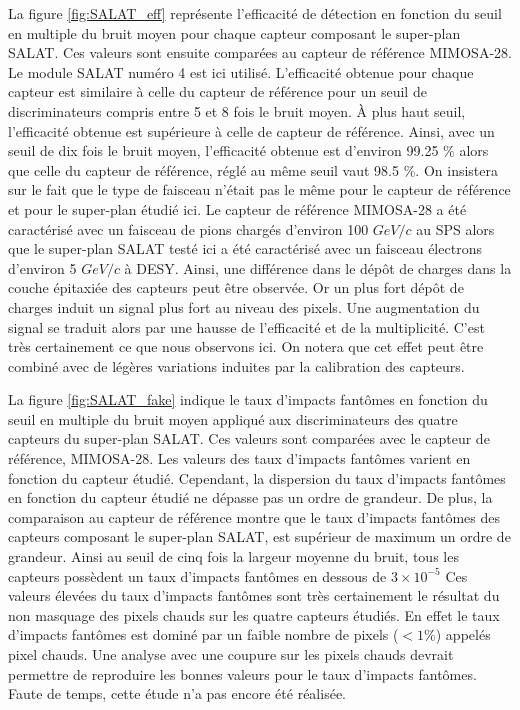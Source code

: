   \medskip
   
  La figure \ref{fig:SALAT_eff} repr\'esente l'efficacit\'e de d\'etection en fonction du seuil en multiple du bruit moyen pour chaque capteur composant le super-plan SALAT. Ces valeurs sont ensuite compar\'ees au capteur de r\'ef\'erence MIMOSA-28. Le module SALAT num\'ero 4 est ici utilis\'e. L'efficacit\'e obtenue pour chaque capteur est similaire \`a celle du capteur de r\'ef\'erence pour un seuil de discriminateurs compris entre 5 et 8 fois le bruit moyen. \`A plus haut seuil, l'efficacit\'e obtenue est sup\'erieure \`a celle de capteur de r\'ef\'erence. Ainsi, avec un seuil de dix fois le bruit moyen, l'efficacit\'e obtenue est d'environ 99.25 $\%$ alors que celle du capteur de r\'ef\'erence, r\'egl\'e au m\^eme seuil vaut 98.5 $\%$. On insistera sur le fait que le type de faisceau n'\'etait pas le m\^eme pour le capteur de r\'ef\'erence et pour le super-plan \'etudi\'e ici. Le capteur de r\'ef\'erence MIMOSA-28 a \'et\'e caract\'eris\'e avec un faisceau de pions charg\'es d'environ 100 $GeV/c$ au SPS alors que le super-plan SALAT test\'e ici a \'et\'e caract\'eris\'e avec un faisceau \'electrons d'environ 5 $GeV/c$ \`a DESY. Ainsi, une diff\'erence dans le d\'epôt de charges dans la couche \'epitaxi\'ee des capteurs peut \^etre observ\'ee. Or un plus fort d\'epôt de charges  induit un signal plus fort au niveau des pixels. Une augmentation du signal se traduit alors par une hausse de l'efficacit\'e et de la multiplicit\'e. C'est tr\`es certainement ce que nous observons ici. On notera que cet effet peut \^etre combin\'e avec de l\'eg\`eres variations induites par la calibration des capteurs. 
  
  \medskip
   
  La figure \ref{fig:SALAT_fake} indique le taux d'impacts fant\^omes en fonction du seuil en multiple du bruit moyen appliqu\'e aux discriminateurs des quatre capteurs du super-plan SALAT. Ces valeurs sont compar\'ees avec le capteur de r\'ef\'erence, MIMOSA-28. Les valeurs des taux d'impacts fant\^omes varient en fonction du capteur \'etudi\'e. Cependant, la dispersion du taux d'impacts fant\^omes en fonction du capteur \'etudi\'e ne d\'epasse pas un ordre de grandeur. De plus, la comparaison au capteur de r\'ef\'erence montre que le taux d'impacts fant\^omes des capteurs composant le super-plan SALAT, est sup\'erieur de maximum un ordre de grandeur. Ainsi au seuil de cinq fois la largeur moyenne du bruit, tous les capteurs poss\`edent un taux d'impacts fant\^omes en dessous de $3 \times 10^{-5}$ Ces valeurs \'elev\'ees du taux d'impacts fant\^omes sont tr\`es certainement le r\'esultat du non masquage des pixels chauds sur les quatre capteurs \'etudi\'es. En effet le taux d'impacts fant\^omes est domin\'e par un faible nombre de pixels ($<1\%$) appel\'es pixel chauds. Une analyse avec une coupure sur les pixels chauds devrait permettre de reproduire les bonnes valeurs pour le taux d'impacts fant\^omes. Faute de temps, cette \'etude n'a pas encore \'et\'e r\'ealis\'ee.
  
